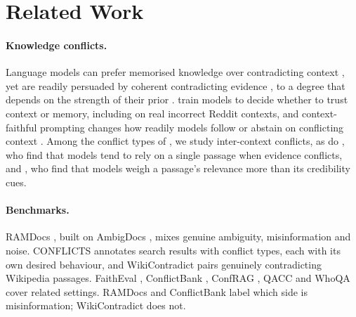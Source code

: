 \section{Related Work}
\label{sec:related}

\paragraph{Knowledge conflicts.}
Language models can prefer memorised knowledge over contradicting context \citep{longpre2021entity}, yet are readily
persuaded by coherent contradicting evidence \citep{xie2024chameleon}, to a degree that depends on the strength of
their prior \citep{wu2024clasheval}. \citet{huang2025trust} train models to decide whether to trust context or memory,
including on real incorrect Reddit contexts, and context-faithful prompting changes how readily models follow
or abstain on conflicting context \citep{zhou2023context}. Among the conflict types of \citet{xu2024survey}, we study inter-context
conflicts, as do \citet{chen2022rich}, who find that models tend to rely on a single passage when evidence conflicts,
and \citet{wan2024convincing}, who find that models weigh a passage's relevance more than its credibility cues.

\paragraph{Benchmarks.}
RAMDocs \citep{wang2025madam}, built on AmbigDocs \citep{lee2024ambigdocs}, mixes genuine ambiguity, misinformation
and noise. CONFLICTS \citep{cattan2025conflicts} annotates search results with conflict types, each with its own
desired behaviour, and WikiContradict \citep{hou2024wikicontradict} pairs genuinely contradicting Wikipedia passages.
FaithEval \citep{ming2025faitheval}, ConflictBank \citep{su2024conflictbank}, ConfRAG \citep{yuan2026confrag},
QACC \citep{liu2025qacc} and WhoQA \citep{pham2024whoqa} cover related settings. RAMDocs and ConflictBank label which side is misinformation; WikiContradict does not.

